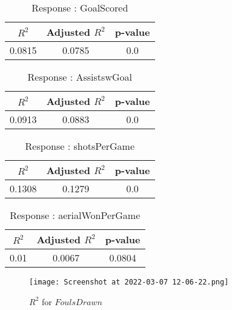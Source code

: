 \documentclass[12pt]{article}
\begin{document}
\begin{minipage}{0.5\textwidth}
	\begin{table}[H]
	\centering
	\caption{Response : GoalScored}\label{table:1a}
	{\begin{tabular}{|c|c|c|}
			\hline
			$ R^2 $ & Adjusted $ R^2 $ & p-value \\
			\hline
			0.0815 & 0.0785 & 0.0 \\
			\hline
		\end{tabular}
	}
\end{table}
\begin{table}[H]
	\centering
	\caption{Response : AssistswGoal}\label{table:1a}
	{\begin{tabular}{|c|c|c|}
			\hline
			$ R^2 $ & Adjusted $ R^2 $ & p-value \\
			\hline
			0.0913 & 0.0883 & 0.0 \\
			\hline
		\end{tabular}
	}
\end{table}
\end{minipage}
\hfill
\begin{minipage}{0.5\textwidth}
	\begin{table}[H]
	\centering
	\caption{Response : shotsPerGame }\label{table:1a}
	{\begin{tabular}{|c|c|c|}
			\hline
			$ R^2 $ & Adjusted $ R^2 $ & p-value \\
			\hline
			0.1308 & 0.1279 & 0.0 \\
			\hline
		\end{tabular}
	}
\end{table}
\begin{table}[H]
	\centering
	\caption{Response : aerialWonPerGame}\label{table:1a}
	{\begin{tabular}{|c|c|c|}
			\hline
			$ R^2 $ & Adjusted $ R^2 $ & p-value \\
			\hline
			0.01 & 0.0067 & 0.0804 \\
			\hline
		\end{tabular}
	}
\end{table}
\end{minipage}

\begin{figure}[H]
	\centering
	\texttt{[image: Screenshot at 2022-03-07 12-06-22.png]}
	\caption{$ R^2 $ for $ FoulsDrawn $}
	\label{fig:1}
\end{figure}
\end{document}
